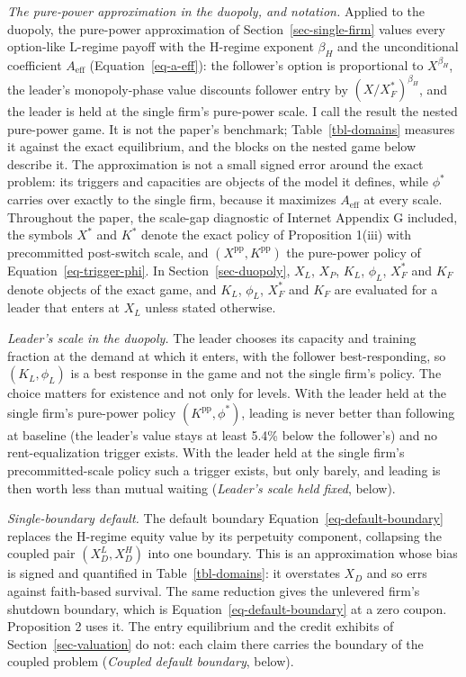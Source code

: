\documentclass[
  11pt,
  letterpaper,
]{scrartcl}
\begin{document}
\emph{The pure-power approximation in the duopoly, and notation.}
Applied to the duopoly, the pure-power approximation of
Section~\ref{sec-single-firm} values every option-like L-regime payoff
with the H-regime exponent \(\beta_H\) and the unconditional coefficient
\(A_{\text{eff}}\) (Equation~\ref{eq-a-eff}): the follower's option is
proportional to \(X^{\beta_H}\), the leader's monopoly-phase value
discounts follower entry by \((X/X_F^*)^{\beta_H}\), and the leader is
held at the single firm's pure-power scale. I call the result the nested
pure-power game. It is not the paper's benchmark;
Table~\ref{tbl-domains} measures it against the exact equilibrium, and
the blocks on the nested game below describe it. The approximation is
not a small signed error around the exact problem: its triggers and
capacities are objects of the model it defines, while \(\phi^*\) carries
over exactly to the single firm, because it maximizes \(A_{\text{eff}}\)
at every scale. Throughout the paper, the scale-gap diagnostic of
Internet Appendix G included, the symbols \(X^*\) and \(K^*\) denote the
exact policy of Proposition 1(iii) with precommitted post-switch scale,
and \((X^{\text{pp}}, K^{\text{pp}})\) the pure-power policy of
Equation~\ref{eq-trigger-phi}. In Section~\ref{sec-duopoly}, \(X_L\),
\(X_P\), \(K_L\), \(\phi_L\), \(X_F^*\) and \(K_F\) denote objects of
the exact game, and \(K_L\), \(\phi_L\), \(X_F^*\) and \(K_F\) are
evaluated for a leader that enters at \(X_L\) unless stated otherwise.

\emph{Leader's scale in the duopoly.} The leader chooses its capacity
and training fraction at the demand at which it enters, with the
follower best-responding, so \((K_L, \phi_L)\) is a best response in the
game and not the single firm's policy. The choice matters for existence
and not only for levels. With the leader held at the single firm's
pure-power policy \((K^{\text{pp}}, \phi^*)\), leading is never better
than following at baseline (the leader's value stays at least 5.4\%
below the follower's) and no rent-equalization trigger exists. With the
leader held at the single firm's precommitted-scale policy such a
trigger exists, but only barely, and leading is then worth less than
mutual waiting (\emph{Leader's scale held fixed}, below).

\emph{Single-boundary default.} The default boundary
Equation~\ref{eq-default-boundary} replaces the H-regime equity value by
its perpetuity component, collapsing the coupled pair \((X_D^L, X_D^H)\)
into one boundary. This is an approximation whose bias is signed and
quantified in Table~\ref{tbl-domains}: it overstates \(X_D\) and so errs
against faith-based survival. The same reduction gives the unlevered
firm's shutdown boundary, which is Equation~\ref{eq-default-boundary} at
a zero coupon. Proposition 2 uses it. The entry equilibrium and the
credit exhibits of Section~\ref{sec-valuation} do not: each claim there
carries the boundary of the coupled problem (\emph{Coupled default
boundary}, below).
\end{document}

